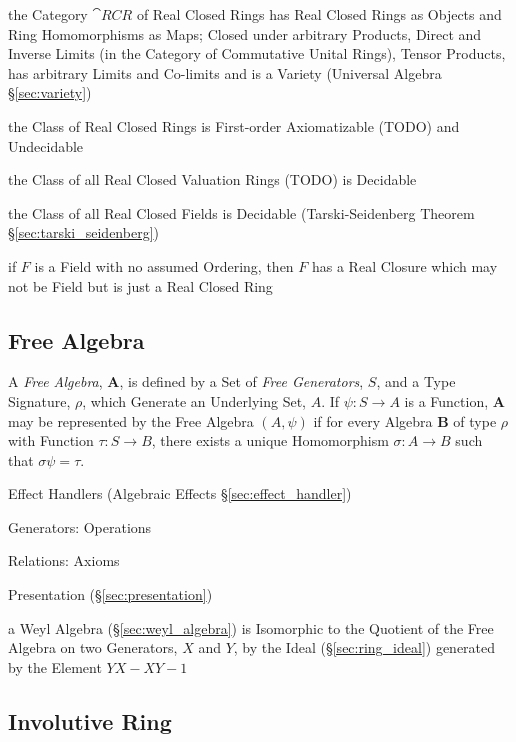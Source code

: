 \begin{itemize}
the Category $\cat{RCR}$ of Real Closed Rings has Real Closed Rings as Objects
and Ring Homomorphisms as Maps; Closed under arbitrary Products, Direct and
Inverse Limits (in the Category of Commutative Unital Rings), Tensor Products,
has arbitrary Limits and Co-limits and is a Variety (Universal Algebra
\S\ref{sec:variety})

the Class of Real Closed Rings is First-order Axiomatizable (TODO) and
Undecidable

the Class of all Real Closed Valuation Rings (TODO) is Decidable

the Class of all Real Closed Fields is Decidable (\fist Tarski-Seidenberg
Theorem \S\ref{sec:tarski_seidenberg})

if $F$ is a Field with no assumed Ordering, then $F$ has a Real Closure which
may not be Field but is just a Real Closed Ring



\subsection{Free Algebra}\label{sec:free_algebra}

A \emph{Free Algebra}, $\mathbf{A}$, is defined by a Set of \emph{Free
  Generators}, $S$, and a Type Signature, $\rho$, which Generate an
Underlying Set, $A$. If $\psi : S \rightarrow A$ is a Function,
$\mathbf{A}$ may be represented by the Free Algebra $(A,\psi)$ if for
every Algebra $\mathbf{B}$ of type $\rho$ with Function $\tau : S
\rightarrow B$, there exists a unique Homomorphism $\sigma : A
\rightarrow B$ such that $\sigma\psi = \tau$.

Effect Handlers (Algebraic Effects \S\ref{sec:effect_handler})

Generators: Operations

Relations: Axioms

Presentation (\S\ref{sec:presentation})

\fist a Weyl Algebra (\S\ref{sec:weyl_algebra}) is Isomorphic to the Quotient
of the Free Algebra on two Generators, $X$ and $Y$, by the Ideal
(\S\ref{sec:ring_ideal}) generated by the Element $YX - XY - 1$



\subsection{Involutive Ring}\label{sec:involutive_ring}


\end{itemize}
